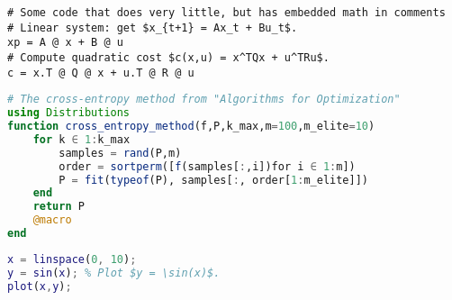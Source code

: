\documentclass[12pt,letterpaper]{article}
\begin{document}
%	

	

	
	
	
\begin{lstlisting}[caption={Python example. Adding equations in comments. Optimal control example.},style=Python,mathescape=true]
# Some code that does very little, but has embedded math in comments
# Linear system: get $x_{t+1} = Ax_t + Bu_t$.
xp = A @ x + B @ u
# Compute quadratic cost $c(x,u) = x^TQx + u^TRu$.
c = x.T @ Q @ x + u.T @ R @ u
\end{lstlisting}


\begin{lstlisting}[caption={Julia example. Cross-entropy method from Prof. Kochenderfer's textbook. Note that most Unicode characters will work.},language=julia, style=jlcodestyle,mathescape=true]
# The cross-entropy method from "Algorithms for Optimization"
using Distributions
function cross_entropy_method(f,P,k_max,m=100,m_elite=10)
	for k ∈ 1:k_max
		samples = rand(P,m)
		order = sortperm([f(samples[:,i])for i ∈ 1:m]) 
		P = fit(typeof(P), samples[:, order[1:m_elite]])
	end
	return P
	@macro
end
\end{lstlisting}


\begin{lstlisting}[caption={Matlab example.},language=matlab, style=matlab,mathescape=true]
x = linspace(0, 10);
y = sin(x); % Plot $y = \sin(x)$.
plot(x,y);
\end{lstlisting}


	

\end{document}
